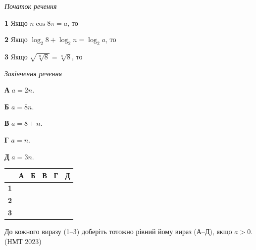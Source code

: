 \documentclass[14pt]{extarticle}
\newcommand{\matchTable}{
\begin{tabular}{|>{\centering\arraybackslash}p{0.3cm}|*{5}{>{\centering\arraybackslash}p{0.3cm}|}}
\hline
& \textbf{А} & \textbf{Б} & \textbf{В} & \textbf{Г} & \textbf{Д} \\
\hline
\textbf{1} & \rule{0pt}{0.3cm} & & & & \\
\hline
\textbf{2} & \rule{0pt}{0.3cm} & & & & \\
\hline
\textbf{3} & \rule{0pt}{0.3cm} & & & & \\
\hline
\end{tabular}
}
\newcommand{\task}[2]{\noindent\makebox[1.5em][l]{\textbf{#1.}}\parbox[t]{\dimexpr\textwidth-1.5em}{#2}}
\newcommand{\nmtyear}[1]{\hfill{\small\color{yearcolor}(НМТ #1)}}
\begin{document}
\vspace{0.3cm}
\begin{minipage}{0.45\textwidth}
\textit{Початок речення}

\vspace{0.2cm}
\textbf{1} \quad Якщо $n \cos 8\pi = a$, то

\vspace{0.2cm}
\textbf{2} \quad Якщо $\log_2 8 + \log_2 n = \log_2 a$, то

\vspace{0.2cm}
\textbf{3} \quad Якщо $\sqrt{\sqrt[n]{8}} = \sqrt[a]{8}$, то
\end{minipage}
\hfill
\begin{minipage}{0.28\textwidth}
\textit{Закінчення речення}

\vspace{0.2cm}
\textbf{А} \quad $a = 2n$.

\vspace{0.2cm}
\textbf{Б} \quad $a = 8n$.

\vspace{0.2cm}
\textbf{В} \quad $a = 8 + n$.

\vspace{0.2cm}
\textbf{Г} \quad $a = n$.

\vspace{0.2cm}
\textbf{Д} \quad $a = 3n$.
\end{minipage}
\hfill
\begin{minipage}{0.2\textwidth}
\matchTable
\end{minipage}

\vspace{0.7cm}

\task{5}{До кожного виразу (1--3) доберіть тотожно рівний йому вираз (А--Д), якщо $a > 0$. \nmtyear{2023}}
\end{document}
